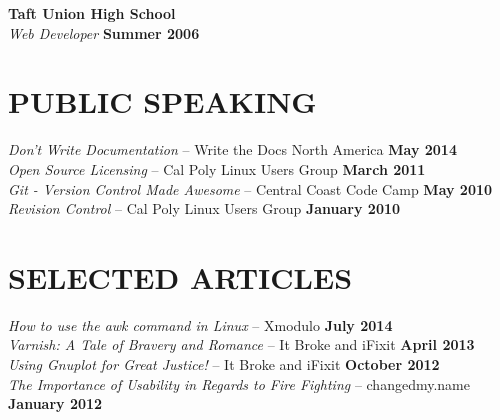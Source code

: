 \documentclass[margin,line]{resume}
\begin{document}
\begin{resume}
    \textbf{\listing Taft Union High School} \vspace{2mm}\\\vspace{1mm}%
    \textsl{Web Developer} \hfill \textbf{Summer 2006}\\

    \vspace{-6mm}

\sectionline

    \section{\mysidestyle \textbf{\large{P}\small{UBLIC} \large{S}\small{PEAKING}}}

    \textsl{Don't Write Documentation} -- Write the Docs North America \hfill \textbf{May 2014}\\
    \textsl{Open Source Licensing} -- Cal Poly Linux Users Group \hfill \textbf{March 2011}\\
    \textsl{Git - Version Control Made Awesome} -- Central Coast Code Camp \hfill \textbf{May 2010}\\
    \textsl{Revision Control} -- Cal Poly Linux Users Group \hfill \textbf{January 2010}\\

    \vspace{-4mm}

\sectionline

    \section{\mysidestyle \textbf{\large{S}\small{ELECTED} \large{A}\small{RTICLES}}}

    \textsl{How to use the awk command in Linux} -- Xmodulo \hfill \textbf{July 2014}\\
    \textsl{Varnish: A Tale of Bravery and Romance} -- It Broke and iFixit \hfill \textbf{April 2013}\\
    \textsl{Using Gnuplot for Great Justice!} -- It Broke and iFixit \hfill \textbf{October 2012}\\
    \textsl{The Importance of Usability in Regards to Fire Fighting} -- changedmy.name \hfill \textbf{January 2012}\\


\end{resume}
\end{document}
